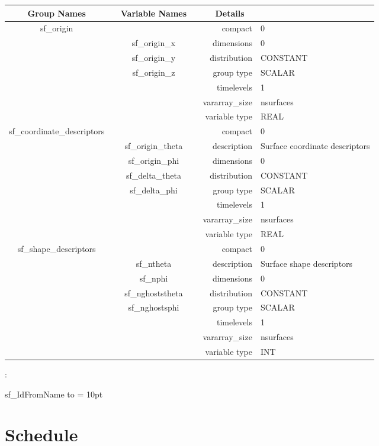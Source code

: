 \begin{tabular*}{150mm}{|c|c@{\extracolsep{\fill}}|rl|} \hline 
~ {\bf Group Names} ~ & ~ {\bf Variable Names} ~  &{\bf Details} ~ & ~ \\ 
\hline 
sf\_origin &  & compact & 0 \\ 
 & sf\_origin\_x & dimensions & 0 \\ 
 & sf\_origin\_y & distribution & CONSTANT \\ 
 & sf\_origin\_z & group type & SCALAR \\ 
 &  & timelevels & 1 \\ 
 &  & vararray\_size & nsurfaces \\ 
 &  & variable type & REAL \\ 
\hline 
sf\_coordinate\_descriptors &  & compact & 0 \\ 
 & sf\_origin\_theta & description & Surface coordinate descriptors \\ 
 & sf\_origin\_phi & dimensions & 0 \\ 
 & sf\_delta\_theta & distribution & CONSTANT \\ 
 & sf\_delta\_phi & group type & SCALAR \\ 
 &  & timelevels & 1 \\ 
 &  & vararray\_size & nsurfaces \\ 
 &  & variable type & REAL \\ 
\hline 
sf\_shape\_descriptors &  & compact & 0 \\ 
 & sf\_ntheta & description & Surface shape descriptors \\ 
 & sf\_nphi & dimensions & 0 \\ 
 & sf\_nghoststheta & distribution & CONSTANT \\ 
 & sf\_nghostsphi & group type & SCALAR \\ 
 &  & timelevels & 1 \\ 
 &  & vararray\_size & nsurfaces \\ 
 &  & variable type & INT \\ 
\hline 
\end{tabular*} 



\vspace{5mm}

: 



sf\_IdFromName to 
\vspace{2mm}\parskip = 10pt 

\section{Schedule} 


